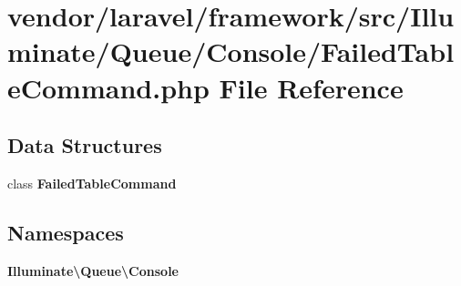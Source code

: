 \section{vendor/laravel/framework/src/\+Illuminate/\+Queue/\+Console/\+Failed\+Table\+Command.php File Reference}
\label{_failed_table_command_8php}
\subsection*{Data Structures}
\begin{DoxyCompactItemize}
\item 
class {\bf Failed\+Table\+Command}
\end{DoxyCompactItemize}
\subsection*{Namespaces}
\begin{DoxyCompactItemize}
\item 
 {\bf Illuminate\textbackslash{}\+Queue\textbackslash{}\+Console}
\end{DoxyCompactItemize}
